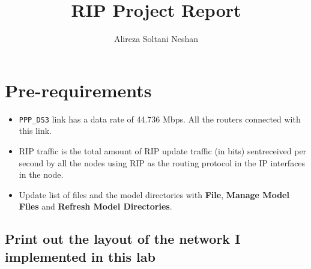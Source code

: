 \documentclass[a4paper]{article}
\title{RIP Project Report}
\author{Alireza Soltani Neshan}
\begin{document}
\maketitle

\section{Pre-requirements}

\begin{itemize}
    \item \texttt{PPP\_DS3} link has a data rate of 44.736 Mbps. All the routers
    connected with this link.
    \item RIP traffic is the total amount of RIP update traffic (in bits)
    sent\/received per second by all the nodes using RIP as the routing protocol
    in the IP interfaces in the node.
    \item Update list of files and the model directories with \textbf{File},
    \textbf{Manage Model Files} and \textbf{Refresh Model Directories}.
\end{itemize}


\subsection{Print out the layout of the network I implemented in this lab}
\end{document}
